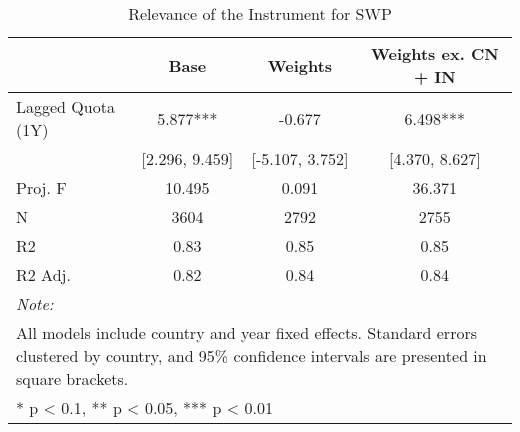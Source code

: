 \begin{table}
\tablefontapp
\caption{Relevance of the Instrument for SWP\label{tab:iv_rel}}
\centering
\begin{tabular}[t]{lccc}
\toprule
  & Base & Weights & Weights ex. CN + IN\\
\midrule
Lagged Quota (1Y) & 5.877*** & -0.677 & 6.498***\\
 & [2.296, 9.459] & [-5.107, 3.752] & [4.370, 8.627]\\
\midrule
Proj. F & 10.495 & 0.091 & 36.371\\
N & 3604 & 2792 & 2755\\
R2 & 0.83 & 0.85 & 0.85\\
R2 Adj. & 0.82 & 0.84 & 0.84\\
\bottomrule
\multicolumn{4}{l}{\rule{0pt}{1em}\textit{Note: }}\\
\multicolumn{4}{l}{\rule{0pt}{1em}All models include country and year fixed effects. Standard errors clustered by country, and 95\% confidence intervals are presented in square brackets.}\\
\multicolumn{4}{l}{\textsuperscript{} * p < 0.1, ** p < 0.05, *** p < 0.01}\\
\end{tabular}
\end{table}
